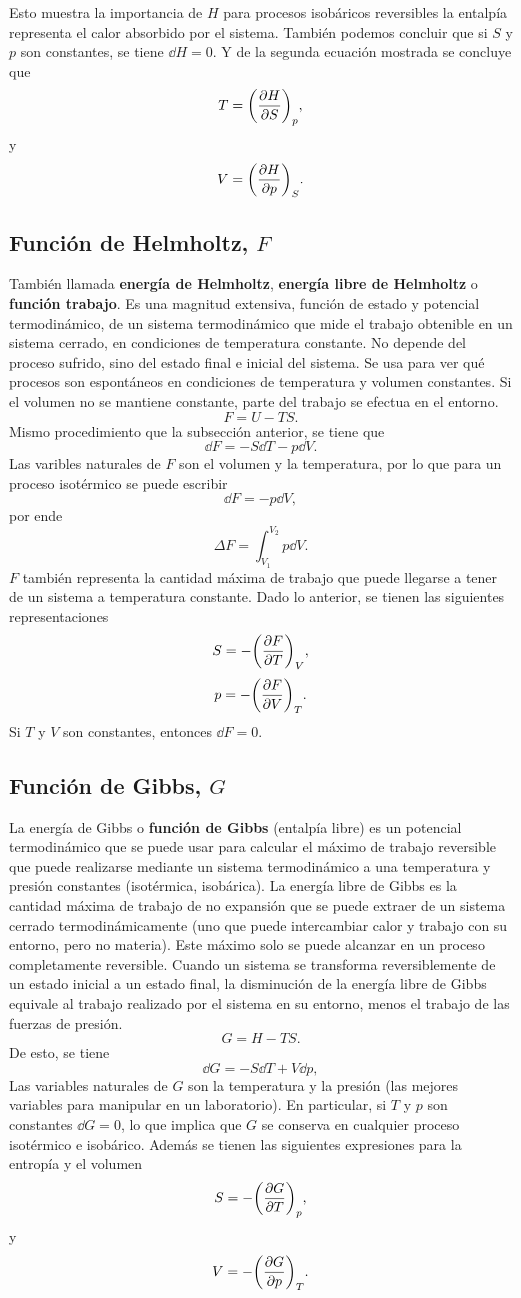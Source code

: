 Esto muestra la importancia de $H$ para procesos isobáricos reversibles la entalpía representa el calor absorbido por el sistema. También podemos concluir que si $S$ y $p$ son constantes, se tiene $\dd{H} = 0$. Y de la segunda ecuación mostrada se concluye que
	$$ T = \qty(\pdv{H}{S})_p, $$
y
	$$ V = \qty(\pdv{H}{p})_S. $$


\subsection{Función de Helmholtz, $F$}
También llamada \textbf{energía de Helmholtz}, \textbf{energía libre de Helmholtz} o \textbf{función trabajo}. Es una magnitud extensiva, función de estado y potencial termodinámico, de un sistema termodinámico que mide el trabajo obtenible en un sistema cerrado, en condiciones de temperatura constante. No depende del proceso sufrido, sino del estado final e inicial del sistema. Se usa para ver qué procesos son espontáneos en condiciones de temperatura y volumen constantes. Si el volumen no se mantiene constante, parte del trabajo se efectua en el entorno.
	$$ F = U - TS. $$
Mismo procedimiento que la subsección anterior, se tiene que
	$$ \dd{F} = -S\dd{T} - p\dd{V}. $$
Las varibles naturales de $F$ son el volumen y la temperatura, por lo que para un proceso isotérmico se puede escribir
	$$ \dd{F} = -p\dd{V}, $$
por ende
	$$ \Delta F = \int _{V_1} ^{V_2} p\dd{V}. $$
$F$ también representa la cantidad máxima de trabajo que puede llegarse a tener de un sistema a temperatura constante. Dado lo anterior, se tienen las siguientes representaciones
	$$ S = -\qty(\pdv{F}{T})_V, $$
	$$ p = -\qty(\pdv{F}{V})_T. $$
Si $T$ y $V$ son constantes, entonces $\dd{F} = 0$.


\subsection{Función de Gibbs, $G$}
La energía de Gibbs o \textbf{función de Gibbs} (entalpía libre) es un potencial termodinámico que se puede usar para calcular el máximo de trabajo reversible que puede realizarse mediante un sistema termodinámico a una temperatura y presión constantes (isotérmica, isobárica). La energía libre de Gibbs es la cantidad máxima de trabajo de no expansión que se puede extraer de un sistema cerrado termodinámicamente (uno que puede intercambiar calor y trabajo con su entorno, pero no materia). Este máximo solo se puede alcanzar en un proceso completamente reversible. Cuando un sistema se transforma reversiblemente de un estado inicial a un estado final, la disminución de la energía libre de Gibbs equivale al trabajo realizado por el sistema en su entorno, menos el trabajo de las fuerzas de presión.
	$$ G = H - TS. $$
De esto, se tiene
	$$ \dd{G} = -S\dd{T} + V\dd{p}, $$
Las variables naturales de $G$ son la temperatura y la presión (las mejores variables para manipular en un laboratorio). En particular, si $T$ y $p$ son constantes $\dd{G} = 0$, lo que implica que $G$ se conserva en cualquier proceso isotérmico e isobárico. Además se tienen las siguientes expresiones para la entropía y el volumen
	$$ S = -\qty(\pdv{G}{T})_p, $$
y
	$$ V = -\qty(\pdv{G}{p})_T. $$

